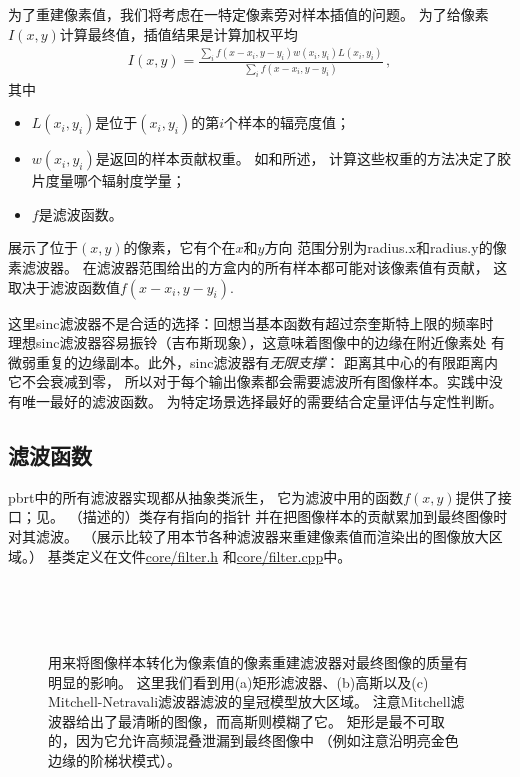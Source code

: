 为了重建像素值，我们将考虑在一特定像素旁对样本插值的问题。
为了给像素$I(x,y)$计算最终值，插值结果是计算加权平均
\begin{align}\label{eq:7.12}
    I(x,y)=\frac{\sum\limits_i {f(x-x_i,y-y_i)w(x_i,y_i)L(x_i,y_i)}}{\sum\limits_i {f(x-x_i,y-y_i)}}\, ,
\end{align}
其中
\begin{itemize}
    \item $L(x_i,y_i)$是位于$(x_i,y_i)$的第$i$个样本的辐亮度值；
    \item $w(x_i,y_i)$是返回的样本贡献权重。
          如和所述，
          计算这些权重的方法决定了胶片度量哪个辐射度学量；
    \item $f$是滤波函数。
\end{itemize}

展示了位于$(x,y)$的像素，它有个在$x$和$y$方向
范围分别为{\ttfamily radius.x}和{\ttfamily radius.y}的像素滤波器。
在滤波器范围给出的方盒内的所有样本都可能对该像素值有贡献，
这取决于滤波函数值$f(x-x_i,y-y_i)$.

这里sinc滤波器不是合适的选择：回想当基本函数有超过奈奎斯特上限的频率时
理想sinc滤波器容易振铃（吉布斯现象），这意味着图像中的边缘在附近像素处
有微弱重复的边缘副本。此外，sinc滤波器有\emph{无限支撑}：
距离其中心的有限距离内它不会衰减到零，
所以对于每个输出像素都会需要滤波所有图像样本。实践中没有唯一最好的滤波函数。
为特定场景选择最好的需要结合定量评估与定性判断。

\subsection{滤波函数}\label{sub:滤波函数}
pbrt中的所有滤波器实现都从抽象类派生，
它为滤波中用的函数$f(x,y)$提供了接口；见。
（描述的）类存有指向的指针
并在把图像样本的贡献累加到最终图像时对其滤波。
（展示比较了用本节各种滤波器来重建像素值而渲染出的图像放大区域。）
基类定义在文件\href{https://github.com/mmp/pbrt-v3/blob/master/src/core/filter.h}{\ttfamily core/filter.h}
和\href{https://github.com/mmp/pbrt-v3/blob/master/src/core/filter.cpp}{\ttfamily core/filter.cpp}中。
\begin{figure}[htbp]
    \centering
    \\
    \\
    \\
    \caption{用来将图像样本转化为像素值的像素重建滤波器对最终图像的质量有明显的影响。
        这里我们看到用(a)矩形滤波器、(b)高斯以及(c) Mitchell-Netravali滤波器滤波的皇冠模型放大区域。
        注意Mitchell滤波器给出了最清晰的图像，而高斯则模糊了它。
        矩形是最不可取的，因为它允许高频混叠泄漏到最终图像中
        （例如注意沿明亮金色边缘的阶梯状模式）。}
    \label{fig:7.39}
\end{figure}

